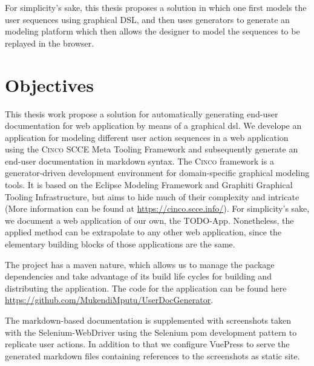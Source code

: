 For simplicity's sake, this thesis proposes a solution in which one first models the user sequences using graphical DSL, and then uses generators to generate an modeling platform which then allows the designer to model the sequences to be replayed in the browser.

\section{Objectives}
This thesis work propose a solution for automatically generating end-user documentation for web application by means of a graphical \acrfull{dsl}. We develope an application for modeling different user action sequences in a web application using the \textsc{Cinco} SCCE Meta Tooling Framework and subsequently generate an end-user documentation in markdown syntax. The \textsc{Cinco} framework is a generator-driven development environment for domain-specific graphical modeling tools. It is based on the Eclipse Modeling Framework and Graphiti Graphical Tooling Infrastructure, but aims to hide much of their complexity and intricate  (More information can be found at \url{https://cinco.scce.info/})\cite{Cinco}. For simplicity's sake, we document a web application of our own, the TODO-App. Nonetheless, the applied method can be extrapolate to any other web application, since the elementary building blocks of those applications are the same.

The project has a maven nature, which allows us to manage the package dependencies and take advantage of its build life cycles for building and distributing the application. The code for the application can be found here \url{https://github.com/MukendiMputu/UserDocGenerator}.

The markdown-based documentation is supplemented with screenshots taken with the Selenium-WebDriver using the \gls{Selenium} \acrfull{pom} development pattern to replicate user actions. In addition to that we configure \gls{VuePress} to serve the generated markdown files containing references to the screenshots as static site.

